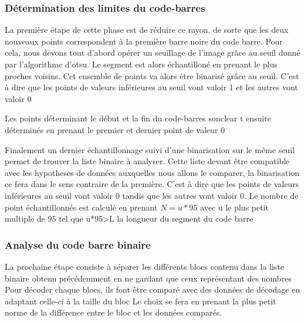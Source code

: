 \documentclass{rapport}
\begin{document}
\subsubsection*{Détermination des limites du code-barres}
La première étape de cette phase est de réduire ce rayon, de sorte que les deux nouveaux points correspondent à la première barre noire du code barre.
Pour cela, nous devons tout d'abord opérer un seuillage de l'image grâce au seuil donné par l'algorithme d'otsu.
Le segment est alors échantilloné en prenant le plus proches voisins. 
Cet ensemble de points va alors être binarisé grâce au seuil. C'est à dire que les points de valeurs inférieures au seuil vont valoir 1 et les autres vont valoir 0

Les points déterminant le début et la fin du code-barres sonclear
t ensuite déterminés en prenant le premier et dernier point de valeur 0

Finalement un dernier échantillonnage suivi d'une binarisation sur le même seuil permet de trouver la liste binaire à analyser. Cette liste devant être compatible avec les hypotheses de données auxquelles nous allons le comparer, la binarisation ce fera dans le sens contraire de la première.
C'est à dire que les points de valeurs inférieures au seuil vont valoir 0 tandis que les autres vont valoir 0.
Le nombre de point échantillonnés est calculé en prenant $N=u*95$ avec u le plus petit multiple de 95 tel que u*95>L la longueur du segment du code barre

\subsubsection{Analyse du code barre binaire}
La prochaine étape consiste à séparer les différents blocs contenu dans la liste binaire obtenu précédemment en ne gardant que ceux représentant des nombres
Pour décoder chaque blocs, ils font être comparé avec des données de décodage en adaptant celle-ci à la taille du bloc 
Le choix se fera en prenant la plus petit norme de la différence entre le bloc et les données comparés.
\end{document}
